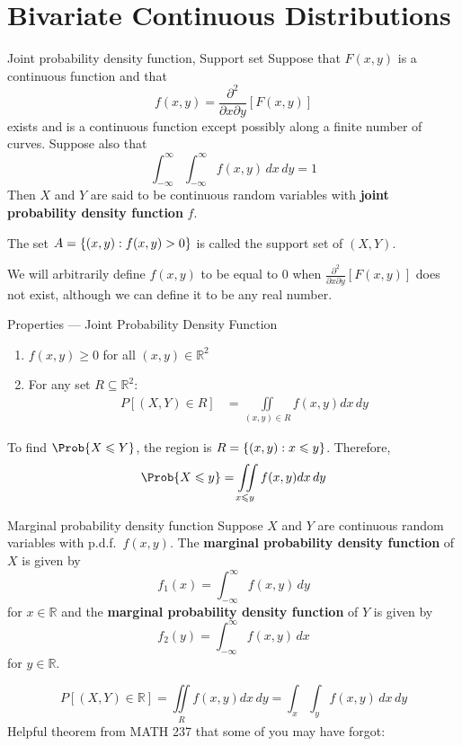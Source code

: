\section{Bivariate Continuous Distributions}
\begin{Definition}{Joint probability density function, Support set}{}
    Suppose that $ F(x,y) $ is a continuous
    function and that
    \[ f(x,y)=\frac{\partial^2}{\partial x\partial y}\left[ F(x,y) \right]  \]
    exists and is a continuous function
    except possibly along a finite number of curves.
    Suppose also that
    \[ \int_{-\infty}^{\infty} \int_{-\infty}^{\infty} f(x,y)\, d{x}\, d{y}=1  \]
    Then $ X $ and $ Y $ are said to be continuous random
    variables with \textbf{joint probability density function} $ f $.

    The set $ A=\{(x,y):f(x,y)>0\} $ is called the support set of $ (X,Y) $.
\end{Definition}
\begin{Remark}{}{}
    We will arbitrarily define $ f(x,y) $ to be equal to $ 0 $ when
    $ \displaystyle  \frac{\partial^2}{\partial x\partial y}\left[ F(x,y) \right]
    $
    does not exist, although we can define it to be any real number.
\end{Remark}
\begin{Definition}{Properties --- Joint Probability Density Function}{}
    \begin{enumerate}[label=(\Roman*)]
        \item $ f(x,y)\geqslant 0 $ for all $ (x,y)\in\mathbb{R}^2 $
        \item For any set $ R\subseteq \mathbb{R}^2 $:
              \begin{align*}
                  P\left[ (X,Y)\in R \right]
                   & =\iint\limits_{(x,y)\in R}f(x,y)dx\,dy
              \end{align*}
    \end{enumerate}
\end{Definition}
\begin{Example}{}{}
    To find $ \Prob{X\leqslant Y} $, the region is
    $ R=\{(x,y):x\leqslant y\} $. Therefore,
    \[ \Prob{X\leqslant y}=
        \iint\limits_{x\leqslant y}f(x,y)dx\,dy \]
\end{Example}
\begin{Definition}{Marginal probability density function}{}
    Suppose $ X $ and $ Y $ are continuous random variables with
    p.d.f.\ $ f(x,y) $. The \textbf{marginal probability
        density function} of $ X $ is given by
    \[ f_1(x)=\int_{-\infty}^{\infty} f(x,y)\, d{y} \]
    for $ x\in\mathbb{R} $ and the \textbf{marginal probability
        density function} of $ Y $ is given by
    \[ f_2(y)=\int_{-\infty}^{\infty} f(x,y)\, d{x}  \]
    for $ y\in\mathbb{R} $.
\end{Definition}
\[ P\left[ (X,Y)\in\mathbb{R} \right]
    =\iint\limits_{R}f(x,y)dx\,dy=
    \int_{x} \int_{y}f(x,y) \, d{x} \, d{y} \]
Helpful theorem from MATH 237 that some of you may have forgot:

